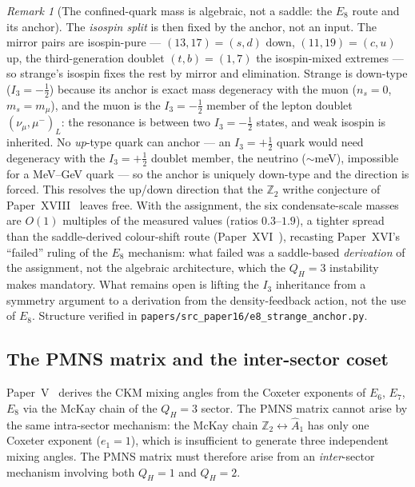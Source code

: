 \documentclass[11pt,a4paper]{article}
\theoremstyle{definition}\newtheorem{definition}[theorem]{Definition}
\theoremstyle{remark}
\newtheorem{remark}[theorem]{Remark}
\newcommand{\QH}{Q_H}
\newcommand{\Ztwo}{\mathbb{Z}_2}
\begin{document}
\begin{remark}[The confined-quark mass is algebraic, not a saddle: the $E_8$ route and its anchor]
The \emph{isospin split} is then fixed by the anchor, not an input. The
mirror pairs are isospin-pure --- $(13,17)=(s,d)$ down, $(11,19)=(c,u)$ up,
the third-generation doublet $(t,b)=(1,7)$ the isospin-mixed extremes --- so
strange's isospin fixes the rest by mirror and elimination. Strange is
down-type ($I_3=-\tfrac12$) because its anchor is exact mass degeneracy with
the muon ($n_s=0$, $m_s=m_\mu$), and the muon is the $I_3=-\tfrac12$ member
of the lepton doublet $(\nu_\mu,\mu^-)_L$: the resonance is between two
$I_3=-\tfrac12$ states, and weak isospin is inherited. No \emph{up}-type
quark can anchor --- an $I_3=+\tfrac12$ quark would need degeneracy with the
$I_3=+\tfrac12$ doublet member, the neutrino ($\sim$meV), impossible for a
MeV--GeV quark --- so the anchor is uniquely down-type and the direction is
forced. This resolves the up/down direction that the $\Ztwo$ writhe
conjecture of Paper~XVIII~\cite{Paper18} leaves free. With the assignment,
the six condensate-scale masses are $O(1)$ multiples of the measured values
(ratios $0.3$--$1.9$), a tighter spread than the saddle-derived colour-shift
route (Paper~XVI~\cite{Paper16}), recasting Paper~XVI's ``failed'' ruling of
the $E_8$ mechanism: what failed was a saddle-based \emph{derivation} of the
assignment, not the algebraic architecture, which the $\QH=3$ instability
makes mandatory. What remains open is lifting the $I_3$ inheritance from a
symmetry argument to a derivation from the density-feedback action, not the
use of $E_8$. Structure verified in
\texttt{papers/src\_paper16/e8\_strange\_anchor.py}.
\end{remark}

\subsection{The PMNS matrix and the inter-sector coset}
\label{P17:sec:pmns}

Paper~V~\cite{Paper5} derives the CKM mixing angles from the Coxeter
exponents of $E_6$, $E_7$, $E_8$ via the McKay chain of the $\QH=3$
sector. The PMNS matrix cannot arise by the same intra-sector mechanism:
the McKay chain $\Ztwo\leftrightarrow\widehat{A}_1$ has only one
Coxeter exponent ($e_1=1$), which is insufficient to generate three
independent mixing angles. The PMNS matrix must therefore arise from an
\emph{inter}-sector mechanism involving both $\QH=1$ and $\QH=2$.
\end{document}
